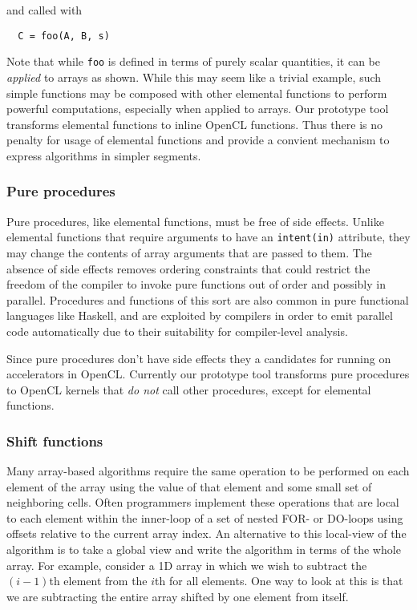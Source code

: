 \noindent and called with

{\small
\begin{verbatim}
  C = foo(A, B, s)
\end{verbatim}
}

Note that while {\tt foo} is defined in terms of purely scalar
quantities, it can be \emph{applied} to arrays as shown.  While this
may seem like a trivial example, such simple functions may be composed
with other elemental functions to perform powerful computations,
especially when applied to arrays.  Our prototype tool transforms
elemental functions to inline OpenCL functions.  Thus there is no
penalty for usage of elemental functions and provide a convient
mechanism to express algorithms in simpler segments.


\subsubsection*{Pure procedures}

Pure procedures, like elemental functions, must be free of side
effects.  Unlike elemental functions that require arguments to have an
{\tt intent(in)} attribute, they may change the contents of array
arguments that are passed to them.  The absence of side effects
removes ordering constraints that could restrict the freedom of the
compiler to invoke pure functions out of order and possibly in parallel.
Procedures and functions of this sort are also common in pure
functional languages like Haskell, and are exploited by compilers in
order to emit parallel code automatically due to their suitability for
compiler-level analysis.

Since pure procedures don't have side effects they a candidates for
running on accelerators in OpenCL.  Currently our prototype tool
transforms pure procedures to OpenCL kernels that \emph{do not} call
other procedures, except for elemental functions.

\subsubsection*{Shift functions}

Many array-based algorithms require the same operation to be performed
on each element of the array using the value of that element and some small
set of neighboring cells.  Often programmers implement these operations that
are local to each element within the inner-loop of a set of nested FOR-
or DO-loops using offsets relative to the current array index.  An alternative
to this local-view of the algorithm is to take a global view and write the
algorithm in terms of the whole array.  For example, consider a 1D array in
which we wish to subtract the $(i-1)$th element from the $i$th for all
elements.  One way to look at this is that we are subtracting the entire array
shifted by one element from itself.


